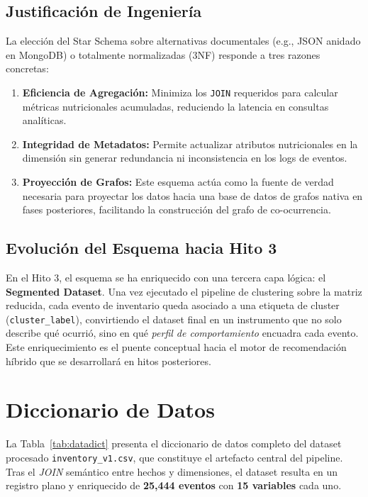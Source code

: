 \documentclass[12pt,a4paper]{article}
\newcommand{\metric}[1]{\textcolor{metricblue}{\textbf{#1}}}
\newcommand{\code}[1]{\texttt{\small #1}}
\begin{document}
\subsection{Justificación de Ingeniería}

La elección del Star Schema sobre alternativas documentales (e.g., JSON anidado en MongoDB) o totalmente normalizadas (3NF) responde a tres razones concretas:

\begin{enumerate}
    \item \textbf{Eficiencia de Agregación:} Minimiza los \code{JOIN} requeridos para calcular métricas nutricionales acumuladas, reduciendo la latencia en consultas analíticas.
    \item \textbf{Integridad de Metadatos:} Permite actualizar atributos nutricionales en la dimensión sin generar redundancia ni inconsistencia en los logs de eventos.
    \item \textbf{Proyección de Grafos:} Este esquema actúa como la fuente de verdad necesaria para proyectar los datos hacia una base de datos de grafos nativa en fases posteriores, facilitando la construcción del grafo de co-ocurrencia.
\end{enumerate}

\subsection{Evolución del Esquema hacia Hito 3}

En el Hito 3, el esquema se ha enriquecido con una tercera capa lógica: el \textbf{Segmented Dataset}. Una vez ejecutado el pipeline de clustering sobre la matriz reducida, cada evento de inventario queda asociado a una etiqueta de cluster (\code{cluster\_label}), convirtiendo el dataset final en un instrumento que no solo describe qué ocurrió, sino en qué \textit{perfil de comportamiento} encuadra cada evento. Este enriquecimiento es el puente conceptual hacia el motor de recomendación híbrido que se desarrollará en hitos posteriores.

\section{Diccionario de Datos}

La Tabla~\ref{tab:datadict} presenta el diccionario de datos completo del dataset procesado \code{inventory\_v1.csv}, que constituye el artefacto central del pipeline. Tras el \textit{JOIN} semántico entre hechos y dimensiones, el dataset resulta en un registro plano y enriquecido de \metric{25{,}444 eventos} con \metric{15 variables} cada uno.
\end{document}
